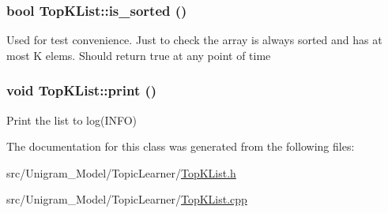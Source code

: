 \label{class_top_k_list_a04d9d3639b61dcf3587a7595532846ed}
\hypertarget{class_top_k_list_a29d4e49e4c5338f203e5228c6d7bb68e}{
\subsubsection[{is\_\-sorted}]{\setlength{\rightskip}{0pt plus 5cm}bool TopKList::is\_\-sorted ()}}
\label{class_top_k_list_a29d4e49e4c5338f203e5228c6d7bb68e}
Used for test convenience. Just to check the array is always sorted and has at most K elems. Should return true at any point of time \hypertarget{class_top_k_list_af7ac4cc51231315ba1a67a92a66683f9}{
\subsubsection[{print}]{\setlength{\rightskip}{0pt plus 5cm}void TopKList::print ()}}
\label{class_top_k_list_af7ac4cc51231315ba1a67a92a66683f9}
Print the list to log(INFO) 

The documentation for this class was generated from the following files:\begin{DoxyCompactItemize}
\item 
src/Unigram\_\-Model/TopicLearner/\hyperlink{_top_k_list_8h}{TopKList.h}\item 
src/Unigram\_\-Model/TopicLearner/\hyperlink{_top_k_list_8cpp}{TopKList.cpp}\end{DoxyCompactItemize}
